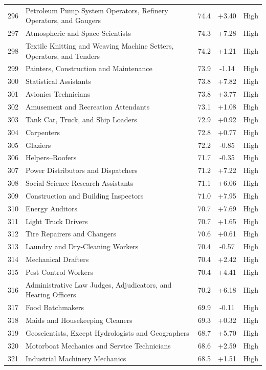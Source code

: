 {\begin{longtable}{rp{7cm}ccc}
296 & Petroleum Pump System Operators, Refinery Operators, and Gaugers & 74.4 & +3.40 & High \\
297 & Atmospheric and Space Scientists & 74.3 & +7.28 & High \\
298 & Textile Knitting and Weaving Machine Setters, Operators, and Tenders & 74.2 & +1.21 & High \\
299 & Painters, Construction and Maintenance & 73.9 & -1.14 & High \\
300 & Statistical Assistants & 73.8 & +7.82 & High \\
301 & Avionics Technicians & 73.8 & +3.77 & High \\
302 & Amusement and Recreation Attendants & 73.1 & +1.08 & High \\
303 & Tank Car, Truck, and Ship Loaders & 72.9 & +0.92 & High \\
304 & Carpenters & 72.8 & +0.77 & High \\
305 & Glaziers & 72.2 & -0.85 & High \\
306 & Helpers--Roofers & 71.7 & -0.35 & High \\
307 & Power Distributors and Dispatchers & 71.2 & +7.22 & High \\
308 & Social Science Research Assistants & 71.1 & +6.06 & High \\
309 & Construction and Building Inspectors & 71.0 & +7.95 & High \\
310 & Energy Auditors & 70.7 & +7.69 & High \\
311 & Light Truck Drivers & 70.7 & +1.65 & High \\
312 & Tire Repairers and Changers & 70.6 & +0.61 & High \\
313 & Laundry and Dry-Cleaning Workers & 70.4 & -0.57 & High \\
314 & Mechanical Drafters & 70.4 & +2.42 & High \\
315 & Pest Control Workers & 70.4 & +4.41 & High \\
316 & Administrative Law Judges, Adjudicators, and Hearing Officers & 70.2 & +6.18 & High \\
317 & Food Batchmakers & 69.9 & -0.11 & High \\
318 & Maids and Housekeeping Cleaners & 69.3 & +0.32 & High \\
319 & Geoscientists, Except Hydrologists and Geographers & 68.7 & +5.70 & High \\
320 & Motorboat Mechanics and Service Technicians & 68.6 & +2.59 & High \\
321 & Industrial Machinery Mechanics & 68.5 & +1.51 & High \\

\end{longtable}}
